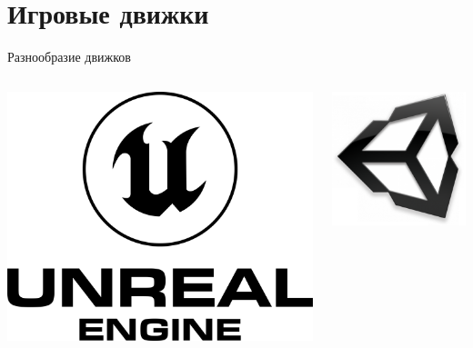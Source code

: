 \documentclass[handout]{beamer}
\begin{document}
    \section{Игровые движки}
    \begin{frame}{Разнообразие движков}
        \begin{columns}
            \begin{column}{0.33\textwidth}
                \includegraphics[width=\textwidth]{img/ue.png}
            \end{column}
            \begin{column}{0.33\textwidth}
                \includegraphics[width=\textwidth]{img/unity.png}

\end{column}
\end{columns}
\end{frame}
\end{document}
